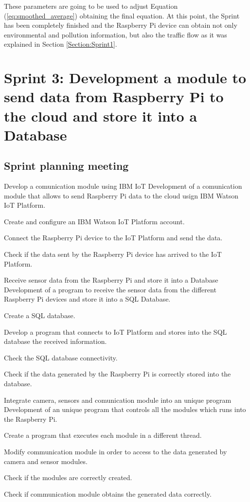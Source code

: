 These parameters are going to be used to adjust Equation (\ref{eq:smoothed_average}) obtaining the final equation. At this point, the Sprint has been completely finished and the Raspberry Pi device can obtain not only environmental and pollution information, but also the traffic flow as it was explained in Section \ref{Section:Sprint1}.


\section{Sprint 3: Development a module to send data from Raspberry Pi to the cloud and store it into a Database}

\subsection{Sprint planning meeting}

{Develop a comunication module using IBM IoT}
{Development of a comunication module that allows to send Raspberry Pi data to the cloud usign IBM Watson IoT Platform.}
{	\item Create and configure an IBM Watson IoT Platform account.
	\item Connect the Raspberry Pi device to the IoT Platform and send the data.
}{	\item Check if the data sent by the Raspberry Pi device has arrived to the IoT Platform.
}

{Receive sensor data from the Raspberry Pi and store it into a Database}
{Development of a program to receive the sensor data from the different Raspberry Pi devices and store it into a SQL Database.}
{	\item Create a SQL database.
	\item Develop a program that connects to IoT Platform and stores into the SQL database the received information.
}{	\item Check the SQL database connectivity.
	\item Check if the data generated by the Raspberry Pi is correctly stored into the database.
}

{Integrate camera, sensors and comunication module into an unique program}
{Development of an unique program that controls all the modules which runs into the Raspberry Pi.}
{	\item Create a program that executes each module in a different thread.
	\item Modify communication module in order to access to the data generated by camera and sensor modules.
}{	\item Check if the modules are correctly created.
	\item Check if communication module obtains the generated data correctly.
}




